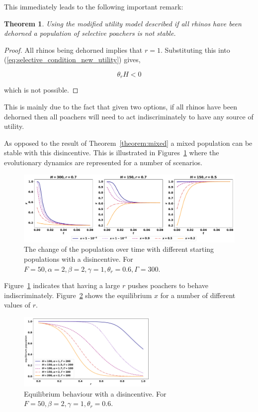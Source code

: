 \documentclass[10pt]{article}
\newtheorem{theorem}{Theorem}
\begin{document}
This immediately leads to the following important remark:

\begin{theorem}
Using the modified utility model described 
if all rhinos have been dehorned a population of selective poachers is not
stable.
\end{theorem}

\begin{proof}
All rhinos being dehorned implies that \(r=1\). Substituting this into 
(\ref{eq:selective_condition_new_utility}) gives,

\begin{equation}
    \theta_r H < 0
\end{equation}

which is not possible.
\end{proof}

This is mainly due to the fact that given two options, if all rhinos have been
dehorned then all poachers will need to act indiscriminately to have any source
of utility.

As opposed to the result of Theorem~\ref{theorem:mixed} a mixed population 
can be stable with this disincentive. This is illustrated in Figures~\ref{fig:ess-new-utility}
where the evolutionary dynamics are represented for a number of scenarios.

\begin{figure}[!htbp]
    \includegraphics[width=\textwidth]{images/ESS-new-utility.pdf}
    \caption{The change of the population over 
    time with different starting populations with a disincentive. For \(F=50, \alpha=2,
    \beta=2, \gamma=1, \theta_r=0.6, \Gamma=300\).}
    \label{fig:ess-new-utility}
\end{figure}

Figure~\ref{fig:ess-new-utility} indicates that having a large \(r\) pushes poachers
to behave indiscriminately. Figure~\ref{fig:equilibrium-over-r-tilde-u} shows the
equilibrium \(x\) for a number of different values of \(r\).

\begin{figure}[!htbp]
\centering
    \includegraphics[width=0.6\textwidth]{images/new-utility-over_r.pdf}
    \caption{Equilibrium behaviour with a disincentive. For \(F=50, \beta=2,
    \gamma=1, \theta_r=0.6\).}
    \label{fig:equilibrium-over-r-tilde-u}
\end{figure}
\end{document}
